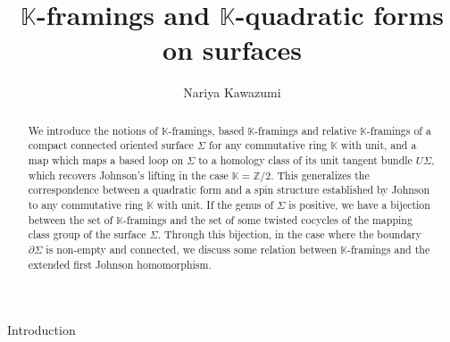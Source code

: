 \documentclass[a4paper,12pt, twoside]{amsart}
\title{$\mathbb{K}$-framings and $\mathbb{K}$-quadratic forms on surfaces}
\author{Nariya Kawazumi}
\date{} %
\theoremstyle{definition}
\theoremstyle{remark}
\numberwithin{equation}{section}
\begin{document}
\maketitle

\begin{abstract} We introduce the notions of $\mathbb{K}$-framings, based $\mathbb{K}$-framings and relative $\mathbb{K}$-framings of a compact connected oriented surface $\Sigma$ for any commutative ring $\mathbb{K}$ with unit, and a map which maps a based loop on $\Sigma$ to a homology class of its unit tangent bundle $U\Sigma$, which recovers Johnson's lifting in the case $\mathbb{K} = \mathbb{Z}/2$. This generalizes the correspondence between a quadratic form and a spin structure established by Johnson to any commutative ring $\mathbb{K}$ with unit. 
If the genus of $\Sigma$ is positive, we have a bijection between the set of $\mathbb{K}$-framings and the set of some twisted cocycles of the mapping class group of the surface $\Sigma$. 
Through this bijection, in the case where the boundary $\partial\Sigma$ is non-empty and connected, we discuss some relation between $\mathbb{K}$-framings and the extended first Johnson homomorphism. 
\end{abstract}

\bigskip
\begin{center}
Introduction
\end{center}
\end{document}
